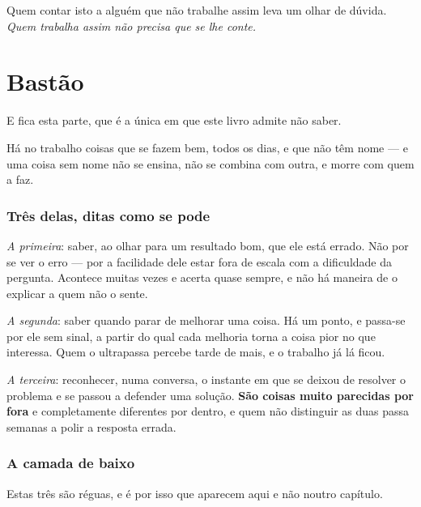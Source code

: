 \documentclass[livro.tex]{subfiles}
\begin{document}
\medskip

Quem contar isto a alguém que não trabalhe assim leva um olhar de dúvida. \emph{Quem trabalha
assim não precisa que se lhe conte.}

\chapter{Bastão}

E fica esta parte, que é a única em que este livro admite não saber.

\medskip

Há no trabalho coisas que se fazem bem, todos os dias, e que não têm nome --- e uma coisa sem nome
não se ensina, não se combina com outra, e morre com quem a faz.

\subsection*{Três delas, ditas como se pode}

\emph{A primeira}: saber, ao olhar para um resultado bom, que ele está errado. Não por se ver o
erro --- por a facilidade dele estar fora de escala com a dificuldade da pergunta. Acontece muitas
vezes e acerta quase sempre, e não há maneira de o explicar a quem não o sente.

\medskip

\emph{A segunda}: saber quando parar de melhorar uma coisa. Há um ponto, e passa-se por ele sem
sinal, a partir do qual cada melhoria torna a coisa pior no que interessa. Quem o ultrapassa
percebe tarde de mais, e o trabalho já lá ficou.

\medskip

\emph{A terceira}: reconhecer, numa conversa, o instante em que se deixou de resolver o problema e
se passou a defender uma solução. \textbf{São coisas muito parecidas por fora} e completamente
diferentes por dentro, e quem não distinguir as duas passa semanas a polir a resposta errada.

\subsection*{A camada de baixo}

Estas três são réguas, e é por isso que aparecem aqui e não noutro capítulo.

\medskip
\end{document}
